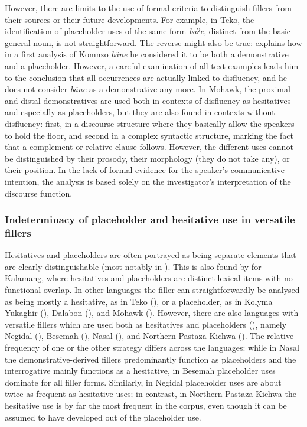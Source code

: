 \documentclass[output=paper]{langscibook}
\begin{document}
However, there are limits to the use of formal criteria to distinguish fillers from their sources or their future developments. For example, in Teko, the identification of placeholder uses of the same form \textit{baʔe}, distinct from the basic general noun, is not straightforward. The reverse might also be true: \citeauthor{chapters/doehler} explains how in a first analysis of Komnzo \textit{bäne} he considered it to be both a demonstrative and a placeholder. However, a careful examination of all text examples leads him to the conclusion that all occurrences are actually linked to disfluency, and he does not consider \textit{bäne} as a demonstrative any more. In Mohawk, the proximal and distal demonstratives are used both in contexts of disfluency as hesitatives and especially as placeholders, but they are also found in contexts without disfluency: first, in a discourse structure where they basically allow the speakers to hold the floor, and second in a complex syntactic structure, marking the fact that a complement or relative clause follows. However, the different uses cannot be distinguished by their prosody, their morphology (they do not take any), or their position. In the lack of formal evidence for the speaker’s communicative intention, the analysis is based solely on the investigator’s interpretation of the discourse function. 

\subsubsection{Indeterminacy of placeholder and hesitative use in versatile fillers}\label{sec:intro:9.2.2}

Hesitatives and placeholders are often portrayed as being separate elements that are clearly distinguishable (most notably in \citealt{Hayashi2006}). This is also found by \citeauthor{chapters/visser} for Kalamang, where hesitatives and placeholders are distinct lexical items with no functional overlap. In other languages the filler can straightforwardly be analysed as being mostly a hesitative, as in Teko (\citeauthor{chapters/rose}), or a placeholder, as in Kolyma Yukaghir (\citeauthor{chapters/ventayol_boada}), Dalabon (\citeauthor{chapters/ponsonnet}), and Mohawk (\citeauthor{chapters/mithun}). However, there are also languages with versatile fillers which are used both as hesitatives and placeholders (), namely Negidal (\citeauthor{chapters/pakendorf}), Besemah (\citeauthor{chapters/mcdonnell_billings}), Nasal (\citeauthor{chapters/billings_mcdonnell}), and Northern Pastaza Kichwa (\citeauthor{chapters/rice}). The relative frequency of one or the other strategy differs across the languages: while in Nasal the demonstrative-derived fillers predominantly function as placeholders and the interrogative mainly functions as a hesitative, in Besemah placeholder uses dominate for all filler forms. Similarly, in Negidal placeholder uses are about twice as frequent as hesitative uses; in contrast, in Northern Pastaza Kichwa the hesitative use is by far the most frequent in the corpus, even though it can be assumed to have developed out of the placeholder use. 
\end{document}
